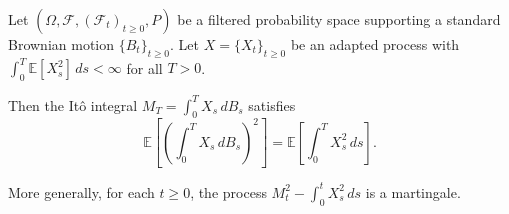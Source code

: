 \begin{theorem} \label{theorem:ito_isometry_for_ito_integrals}
Let $(\Omega, \mathcal{F}, (\mathcal{F}_t)_{t \geq 0}, P)$ be a filtered probability space supporting a standard Brownian motion $\{B_t\}_{t \geq 0}$. Let $X = \{X_t\}_{t \geq 0}$ be an adapted process with $\int_0^T \mathbb{E}[X_s^2] \, ds < \infty$ for all $T > 0$.

Then the Itô integral $M_T = \int_0^T X_s \, dB_s$ satisfies
$$\mathbb{E}\left[\left(\int_0^T X_s \, dB_s\right)^2\right] = \mathbb{E}\left[\int_0^T X_s^2 \, ds\right].$$

More generally, for each $t \geq 0$, the process $M_t^2 - \int_0^t X_s^2 \, ds$ is a martingale.
\end{theorem}
